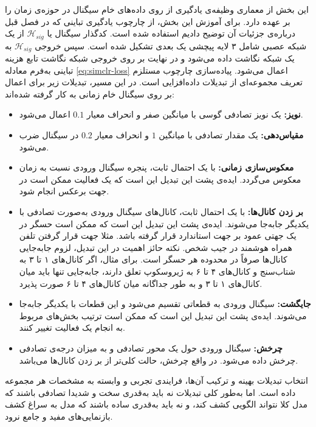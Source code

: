 این بخش از معماری وظیفه‌ی یادگیری از روی داده‌های خام سیگنال در حوزه‌ی زمان را بر عهده دارد. برای آموزش این بخش، از چارچوب یادگیری تباینی
که در فصل قبل درباره‌ی جزئیات آن توضیح دادیم استفاده شده است. کدگذار سیگنال یا
$\mathcal{H}_{sig}$
از یک شبکه عصبی شامل ۳ لایه پیچشی یک بعدی تشکیل شده است. سپس خروجی $\mathcal{H}_{sig}$
به یک شبکه نگاشت داده می‌شود و در نهایت بر روی خروجی شبکه نگاشت تابع هزینه تباینی  به‌فرم معادله \ref{eq:simclr-loss}
اعمال می‌شود.
پیاده‌سازی چارچوب  مستلزم تعریف مجموعه‌ای از تبدیلات داده‌افزایی است. در این مسیر، تبدیلات زیر برای اعمال بر روی سیگنال خام زمانی به کار گرفته شده‌اند:
\begin{itemize}
    \item\textbf{نویز:} یک نویز تصادفی گوسی با میانگین صفر و انحراف معیار $0.1$ اعمال می‌شود.
    \item\textbf{مقیاس‌دهی:}
    یک مقدار تصادفی با میانگین $1$ و انحراف معیار $0.2$ در سیگنال ضرب می‌شود.
    \item\textbf{معکوس‌سازی زمانی:}
    با یک احتمال ثابت، پنجره سیگنال ورودی نسبت به زمان معکوس می‌گردد. ایده‌ی پشت این تبدیل این است که یک فعالیت ممکن است در جهت برعکس انجام شود.
    \item\textbf{بر زدن کانال‌ها:}
    با یک احتمال ثابت، کانال‌های سیگنال ورودی به‌صورت تصادفی با یکدیگر جابه‌جا می‌شوند. ایده‌ی پشت این تبدیل این است که ممکن است حسگر در یک جهتی عمود بر جهت استاندارد قرار گرفته باشد. مثلا جهت قرار گرفتن تلفن همراه هوشمند در جیب شخص. نکته حائز اهمیت در این تبدیل، لزوم جابه‌جایی کانال‌ها صرفاً در محدوده هر حسگر است. برای مثال، اگر کانال‌های ۱ تا ۳ به شتاب‌سنج و کانال‌های ۴ تا ۶ به ژیروسکوپ تعلق دارند، جابه‌جایی تنها باید میان کانال‌های ۱ تا ۳ و به طور جداگانه میان کانال‌های ۴ تا ۶ صورت پذیرد.
    \item\textbf{جایگشت:} سیگنال ورودی به قطعاتی تقسیم می‌شود و این قطعات با یکدیگر جابه‌جا می‌شوند. ایده‌ی پشت این تبدیل این است که ممکن است ترتیب بخش‌های مربوط به انجام یک فعالیت تغییر کنند.
    \item\textbf{چرخش:}
    سیگنال ورودی حول یک محور تصادفی و به میزان درجه‌ی تصادفی چرخش داده می‌شود. در واقع چرخش، حالت کلی‌تر از بر زدن کانال‌ها می‌باشد.
\end{itemize}

انتخاب تبدیلات بهینه و ترکیب آن‌ها، فرایندی تجربی و وابسته به مشخصات هر مجموعه داده است. اما به‌طور کلی تبدیلات نه باید به‌قدری سخت و شدیدا تصادفی باشند که مدل کلا نتواند الگویی کشف کند، و نه باید به‌قدری ساده باشند که مدل به سراغ کشف بازنمایی‌های مفید و جامع نرود.

